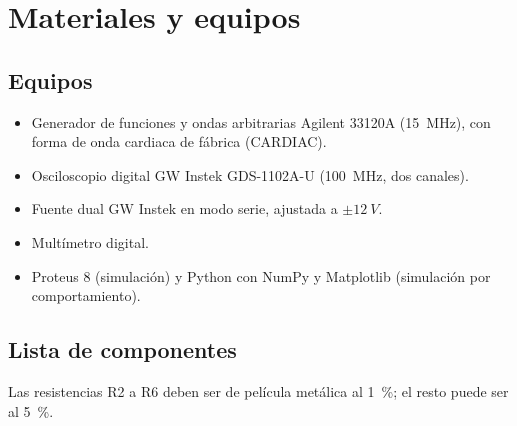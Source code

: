 \documentclass[11pt,letterpaper]{article}
\begin{document}
\section{Materiales y equipos}

\subsection{Equipos}
\begin{itemize}
  \item Generador de funciones y ondas arbitrarias Agilent 33120A (\SI{15}{MHz}), con forma de onda cardiaca de fábrica (CARDIAC).
  \item Osciloscopio digital GW Instek GDS-1102A-U (\SI{100}{MHz}, dos canales).
  \item Fuente dual GW Instek en modo serie, ajustada a $\pm\SI{12}{V}$.
  \item Multímetro digital.
  \item Proteus 8 (simulación) y Python con NumPy y Matplotlib (simulación por comportamiento).
\end{itemize}

\subsection{Lista de componentes}
Las resistencias R2 a R6 deben ser de película metálica al \SI{1}{\percent}; el resto puede ser al \SI{5}{\percent}.
\end{document}
